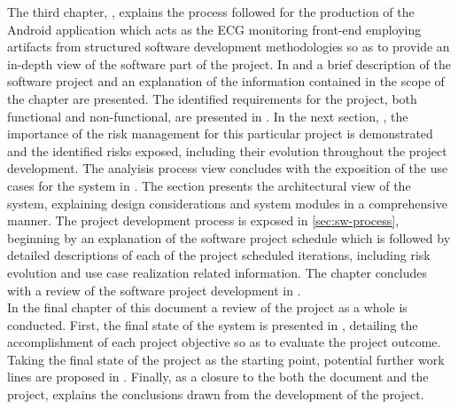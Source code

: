 		The third chapter, \emph{}, explains the process followed for the production of the Android application which acts as the ECG monitoring front-end employing artifacts from structured software development methodologies so as to provide an in-depth view of the software part of the project. In  and  a brief description of the software project and an explanation of the information contained in the scope of the chapter are presented. The identified requirements for the project, both functional and non-functional, are presented in . In the next section, \emph{}, the importance of the risk management for this particular project is demonstrated and the identified risks exposed, including their evolution throughout the project development. The analyisis process view concludes with the exposition of the use cases for the system in . The \emph{} section presents the architectural view of the system, explaining design considerations and system modules in a comprehensive  manner. The project development process is exposed in \autoref{sec:sw-process}, beginning by an explanation of the software project schedule which is followed by detailed descriptions of each of the project scheduled iterations, including risk evolution and use case realization related information. The chapter concludes with a review of the software project development in .\\

		In the final chapter of this document a review of the project as a whole is conducted. First, the final state of the system is presented in , detailing the accomplishment of each project objective so as to evaluate the project outcome. Taking the final state of the project as the starting point, potential further work lines are proposed in . Finally, as a closure to the both the document and the project,  explains the conclusions drawn from the development of the project.

